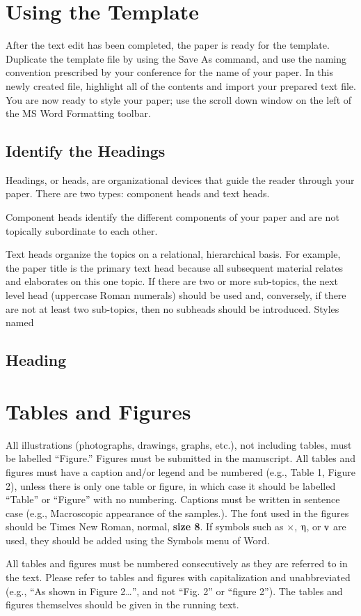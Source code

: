 \documentclass{article} %
\begin{document}
\begin{multicols}{2}
\section{ Using the Template}

After the text edit has been completed, the paper is ready for the template. Duplicate the template file by using the Save As command, and use the naming convention prescribed by your conference for the name of your paper. In this newly created file, highlight all of the contents and import your prepared text file. You are now ready to style your paper; use the scroll down window on the left of the MS Word Formatting toolbar.


\subsection{ Identify the Headings}

Headings, or heads, are organizational devices that guide the reader through your paper. There are two types: component heads and text heads.

Component heads identify the different components of your paper and are not topically subordinate to each other. 

\noindent Text heads organize the topics on a relational, hierarchical basis. For example, the paper title is the primary text head because all subsequent material relates and elaborates on this one topic. If there are two or more sub-topics, the next level head (uppercase Roman numerals) should be used and, conversely, if there are not at least two sub-topics, then no subheads should be introduced. Styles named 


\subsection{ Heading}


\section{ Tables and Figures}

\noindent All illustrations (photographs, drawings, graphs, etc.), not including tables, must be labelled ``Figure.'' Figures must be submitted in the manuscript. All tables and figures must have a caption and/or legend and be numbered (e.g., Table 1, Figure 2), unless there is only one table or figure, in which case it should be labelled ``Table'' or ``Figure'' with no numbering. Captions must be written in sentence case (e.g., Macroscopic appearance of the samples.). The font used in the figures should be Times New Roman, normal, \textbf{size 8}. If symbols such as $\times$,  $\etaup$, or $\nuup$ are used, they should be added using the Symbols menu of Word. \par
All tables and figures must be numbered consecutively as they are referred to in the text. Please refer to tables and figures with capitalization and unabbreviated (e.g., ``As shown in Figure 2{\dots}'', and not ``Fig. 2'' or ``figure 2''). The tables and figures themselves should be given in the running text. \par


\end{multicols}
\end{document}
